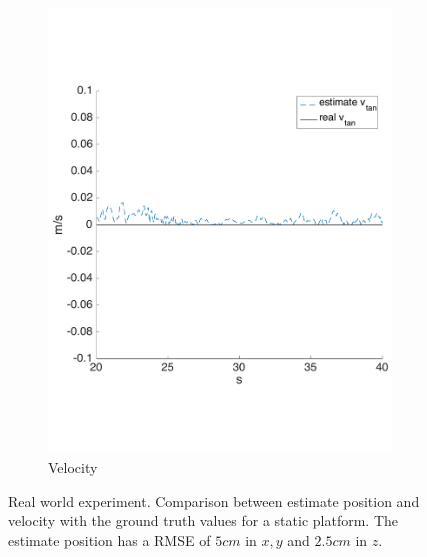 \begin{figure}[!htbp]
\begin{subfigure}[b]{0.45\textwidth}
        \includegraphics[width=\textwidth]{img/tag_static_real_world_vel.pdf}
        \caption{Velocity}
        \label{fig:two_ekf_real_world_static}
   \end{subfigure}
  \caption{Real world experiment. Comparison between estimate position and velocity with the ground truth values for a static platform. The estimate position has a RMSE of $5cm$ in $x,y$ and $2.5cm$ in $z$.}
  \label{fig:ekf_real_world_static}
\end{figure} 

